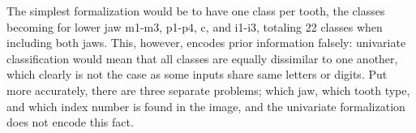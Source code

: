 \documentclass[english,twoside,openright]{UH_DS_MSc}
\begin{document}
The simplest formalization would be to have one class per tooth, the classes becoming for lower jaw m1-m3, p1-p4, c, and i1-i3,
totaling 22 classes when including both jaws. This, however, encodes prior information falsely: univariate classification would 
mean that all classes are equally dissimilar to one another, which clearly is not the case as some inputs share same letters or digits.
Put more accurately, there are three separate problems; which jaw, which tooth type, and which index number is found in the image, 
and the univariate formalization does not encode this fact.


\end{document}
